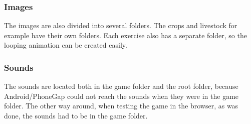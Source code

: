 \subsubsection{Images}
The images are also divided into several folders. The crops and livestock for example have their own folders. Each exercise also has a separate folder, so the looping animation can be created easily.

\subsubsection{Sounds}
The sounds are located both in the game folder and the root folder, because Android/PhoneGap could not reach the sounds when they were in the game folder. The other way around, when testing the game in the browser, as was done, the sounds had to be in the game folder.